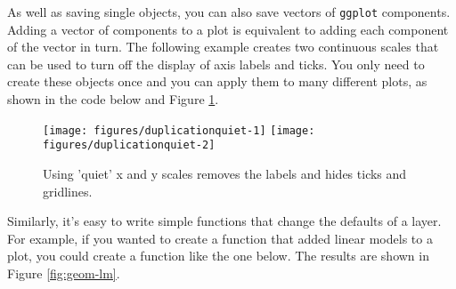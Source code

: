 As well as saving single objects, you can also save vectors of
\texttt{ggplot} components. Adding a vector of components to a plot is
equivalent to adding each component of the vector in turn. The following
example creates two continuous scales that can be used to turn off the
display of axis labels and ticks. You only need to create these objects
once and you can apply them to many different plots, as shown in the
code below and Figure \ref{fig:quiet}. 

\begin{Shaded}
\begin{Highlighting}[]
\StringTok{ }\NormalTok{(} \NormalTok{)}
\StringTok{ }\NormalTok{(} \NormalTok{)}

 \StringTok{ }
 \StringTok{ }\StringTok{ }
\end{Highlighting}
\end{Shaded}

\begin{figure}

{\centering \texttt{[image: figures/duplicationquiet-1]} \texttt{[image: figures/duplicationquiet-2]} 

}

\caption{Using 'quiet' x and y scales removes the labels and hides ticks and gridlines.\label{fig:quiet}}
\end{figure}

Similarly, it's easy to write simple functions that change the defaults
of a layer. For example, if you wanted to create a function that added
linear models to a plot, you could create a function like the one below.
The results are shown in Figure \ref{fig:geom-lm}.

\begin{Shaded}
\begin{Highlighting}[]
\StringTok{ } \StringTok{ }
  \NormalTok{(}  \NormalTok{, } \NormalTok{)}
\NormalTok{\}}
 \StringTok{ }\NormalTok{()}
\NormalTok{(}\NormalTok{)}
 \StringTok{ }\StringTok{ }\NormalTok{))}
\end{Highlighting}
\end{Shaded}

